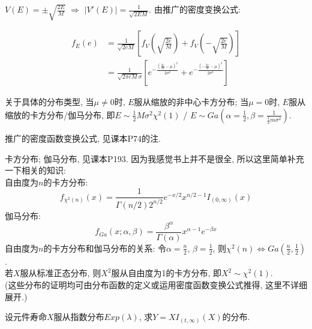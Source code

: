 \documentclass[standard]{ExBook}
\begin{document}
\begin{qitems}
\begin{bbox}
$V(E)=\pm\sqrt{\displaystyle\frac{2E}{M}}$ $\Longrightarrow$ $|V'(E)|=\displaystyle\frac{1}{\sqrt{2EM}}$. 由推广的密度变换公式:
\vspace{-2em}
\begin{center}
\begin{equation}
\begin{aligned}
    \nonumber
f_{E}(e)&=\displaystyle\frac{1}{\sqrt{2eM}}\left[f_{V}\left(\sqrt{\frac{2e}{M}}\right)+f_{V}\left(-\sqrt{\frac{2e}{M}}\right)\right]\\
 &=\displaystyle\frac{1}{\sqrt{2\pi eM}\sigma}\left[e^{-\displaystyle\frac{(\frac{2e}{M}-\mu)^2}{2 \sigma^2}}+e^{-\displaystyle\frac{(-\frac{2e}{M}-\mu)^2}{2 \sigma^2}}\right]
\end{aligned}
\end{equation}
\end{center}
关于具体的分布类型, 当$\mu\neq0$时, $E$服从缩放的非中心卡方分布; 当$\mu=0$时, $E$服从缩放的卡方分布/伽马分布, 即$E\sim\frac{1}{2}M \sigma^2 \chi^{2}(1)$ / $E\sim Ga(\alpha=\frac{1}{2},\beta=\frac{1}{\frac{1}{2}m \sigma^2})$.
    \end{bbox}

\vspace{-5em}

    \begin{bbox}
\textcolor{themeColor}{\selectfont {} 推广的密度函数变换公式, 见课本P74的注.}

\textcolor{themeColor}{\selectfont {} 卡方分布; 伽马分布, 见课本P193. 因为我感觉书上并不是很全, 所以这里简单补充一下相关的知识:\\
自由度为$n$的卡方分布:
$$f_{\chi^{2}(n)}(x)=\displaystyle\frac{1}{\Gamma(n/2) 2^{n/2}}e^{-x/2}x^{n/2-1}I_{(0,\infty)}(x)$$
伽马分布:
$$f_{Ga}(x;\alpha,\beta)=\frac{\beta^{\alpha}}{\Gamma(\alpha)}x^{\alpha-1}e^{-\beta x}$$
自由度为$n$的卡方分布和伽马分布的关系: 令$\alpha=\frac{n}{2}$, $\beta=\frac{1}{2}$, 则$\chi^{2}(n)\Longleftrightarrow Ga(\frac{n}{2},\frac{1}{2})$.\\
若$X$服从标准正态分布, 则$X^{2}$服从自由度为1的卡方分布, 即$X^{2}\sim\chi^{2}(1)$.\\
(这些分布的证明均可由分布函数的定义或运用密度函数变换公式推得, 这里不详细展开.)}
    \end{bbox}

\vspace{-5em}

    \begin{bbox}
    \begin{shaded}
        \qitem
设元件寿命$X$服从指数分布$Exp(\lambda)$, 求$Y=XI_{(t,\infty)}(X)$的分布.
    \end{shaded}
    \end{bbox}


\end{qitems}
\end{document}
